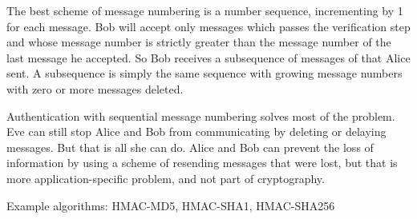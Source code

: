 The best scheme of message numbering is a number sequence, incrementing by 1 for each message. Bob will accept only messages which passes the verification step and whose message number is strictly greater than the message number of the last message he accepted. So Bob receives a subsequence of messages of that Alice sent. A subsequence is simply the same sequence with growing message numbers with zero or more messages deleted.

Authentication with sequential message numbering solves most of the problem. Eve can still stop Alice and Bob from communicating by deleting or delaying messages. But that is all she can do. Alice and Bob can prevent the loss of information by using a scheme of resending messages that were lost, but that is more application-specific problem, and not part of cryptography.

Example algorithms: HMAC-MD5, HMAC-SHA1, HMAC-SHA256
